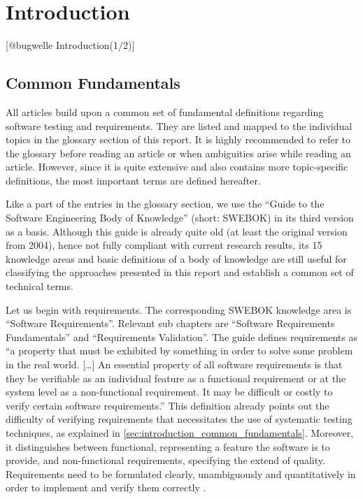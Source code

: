 \chapter{Introduction}\label{sec:introduction}
[@bugwelle Introduction(1/2)]

\section{Common Fundamentals}\label{sec:introduction_common_fundamentals}
All articles build upon a common set of fundamental definitions regarding software testing and requirements.
They are listed and mapped to the individual topics in the glossary section of this report.
It is highly recommended to refer to the glossary before reading an article or when ambiguities arise while reading an article.
However, since it is quite extensive and also contains more topic-specific definitions, the most important terms are defined hereafter.

Like a part of the entries in the glossary section, we use the \enquote{Guide to the Software Engineering Body of Knowledge} (short: SWEBOK) in its third version as a basis.
Although this guide is already quite old (at least the original version from 2004), hence not fully compliant with current research results, its 15 knowledge areas and basic definitions of a body of knowledge are still useful for classifying the approaches presented in this report and establish a common set of technical terms.

Let us begin with requirements.
The corresponding SWEBOK knowledge area is \enquote{Software Requirements}.
Relevant sub chapters are \enquote{Software Requirements Fundamentals} and \enquote{Requirements Validation}.
The guide defines requirements as \enquote{a property that must be exhibited by something in order to solve some problem in the real world. [\ldots]
An essential property of all software requirements is that they be verifiable as an individual feature as a functional requirement or at the system level as a non-functional requirement.
It may be difficult or costly to verify certain software requirements.} \cite{SWEBOK}
This definition already points out the difficulty of verifying requirements that necessitates the use of systematic testing techniques, as explained in \autoref{sec:introduction_common_fundamentals}.
Moreover, it distinguishes between functional, representing a feature the software is to provide, and non-functional requirements, specifying the extend of quality.
Requirements need to be formulated clearly, unambiguously and quantitatively in order to implement and verify them correctly \cite{SWEBOK}.

